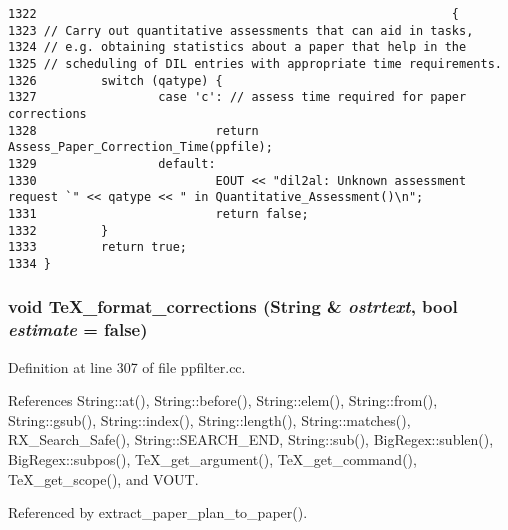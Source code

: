 \footnotesize\begin{verbatim}1322                                                          {
1323 // Carry out quantitative assessments that can aid in tasks,
1324 // e.g. obtaining statistics about a paper that help in the
1325 // scheduling of DIL entries with appropriate time requirements.
1326         switch (qatype) {
1327                 case 'c': // assess time required for paper corrections
1328                         return Assess_Paper_Correction_Time(ppfile);
1329                 default:
1330                         EOUT << "dil2al: Unknown assessment request `" << qatype << " in Quantitative_Assessment()\n";
1331                         return false;
1332         }
1333         return true;
1334 }
\end{verbatim}\normalsize 
{}
\subsubsection{\setlength{\rightskip}{0pt plus 5cm}void Te\-X\_\-format\_\-corrections ({\bf String} \& {\em ostrtext}, bool {\em estimate} = {\bf false})}\label{ppfilter_8cc_a8}




Definition at line 307 of file ppfilter.cc.

References String::at(), String::before(), String::elem(), String::from(), String::gsub(), String::index(), String::length(), String::matches(), RX\_\-Search\_\-Safe(), String::SEARCH\_\-END, String::sub(), Big\-Regex::sublen(), Big\-Regex::subpos(), Te\-X\_\-get\_\-argument(), Te\-X\_\-get\_\-command(), Te\-X\_\-get\_\-scope(), and VOUT.

Referenced by extract\_\-paper\_\-plan\_\-to\_\-paper().



